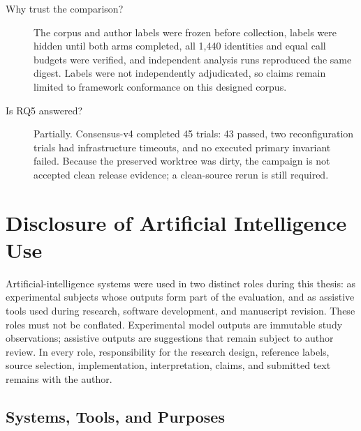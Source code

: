 \begin{description}
  \item[Why trust the comparison?] The corpus and author labels were frozen before collection, labels were hidden until both arms completed, all 1,440 identities and equal call budgets were verified, and independent analysis runs reproduced the same digest. Labels were not independently adjudicated, so claims remain limited to framework conformance on this designed corpus.
  \item[Is RQ5 answered?] Partially. Consensus-v4 completed 45 trials: 43 passed, two reconfiguration trials had infrastructure timeouts, and no executed primary invariant failed. Because the preserved worktree was dirty, the campaign is not accepted clean release evidence; a clean-source rerun is still required.
\end{description}

\chapter{Disclosure of Artificial Intelligence Use}
\label{app:ai-disclosure}

Artificial-intelligence systems were used in two distinct roles during this thesis: as experimental subjects whose outputs form part of the evaluation, and as assistive tools used during research, software development, and manuscript revision. These roles must not be conflated. Experimental model outputs are immutable study observations; assistive outputs are suggestions that remain subject to author review. In every role, responsibility for the research design, reference labels, source selection, implementation, interpretation, claims, and submitted text remains with the author.

\clearpage
\section{Systems, Tools, and Purposes}

